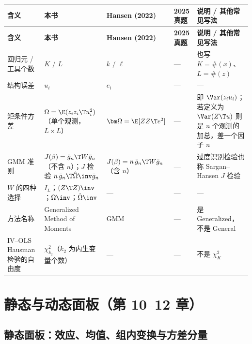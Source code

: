 {\renewcommand{\arraystretch}{1.15}\begin{longtable}{@{}>{\raggedright\arraybackslash\small}p{2.3cm}>{\raggedright\arraybackslash\small}p{3.7cm}>{\raggedright\arraybackslash\small}p{3.0cm}>{\raggedright\arraybackslash\small}p{2.2cm}>{\raggedright\arraybackslash\small}p{3.4cm}@{}}
\toprule
\textbf{含义} & \textbf{本书} & \textbf{Hansen (2022)} & \textbf{2025 真题} & \textbf{说明 / 其他常见写法}\\
\midrule
\endfirsthead
\toprule
\textbf{含义} & \textbf{本书} & \textbf{Hansen (2022)} & \textbf{2025 真题} & \textbf{说明 / 其他常见写法}\\
\midrule
\endhead
\bottomrule
\endlastfoot
回归元 / 工具个数 & $K$ / $L$ & $k$ / $\ell$ & — & 也写 $K=\#(x)$、$L=\#(z)$\\
\addlinespace[1pt]
结构误差 & $u_i$ & $e_i$ & — & —\\
\addlinespace[1pt]
矩条件方差 & $\Omega=\E(z_iz_i\T u_i^2)$（单个观测，$L\times L$） & $\bm\Omega=\E[ZZ\T e^2]$ & — & 即 $\Var(z_iu_i)$；若定义为 $\Var(Z\T u)$ 则是 $n$ 个观测的加总，差一个因子 $n$\\
\addlinespace[1pt]
GMM 准则 & $J(\beta)=\bar g_n\T W\bar g_n$（不含 $n$）；$J$ 检验 $n\,\bar g_n\T\hat\Omega\inv\bar g_n$ & $J(\beta)=n\,\bar g_n\T W\bar g_n$（含 $n$） & — & 过度识别检验也称 Sargan–Hansen $J$ 检验\\
\addlinespace[1pt]
$W$ 的四种选择 & $I_L$；$(Z\T Z)\inv$；$\Omega\inv$；$\hat\Omega\inv$ & — & — & —\\
\addlinespace[1pt]
方法名称 & Generalized Method of Moments & GMM & — & 是 Generalized，不是 General\\
\addlinespace[1pt]
IV–OLS Hausman 检验的自由度 & $\chi^2_{k_2}$（$k_2$ 为内生变量个数） & — & — & 不是 $\chi^2_K$\\
\end{longtable}}


\section{静态与动态面板（第 10–12 章）}\label{sec:UappD-panel}

\subsection{静态面板：效应、均值、组内变换与方差分量}

